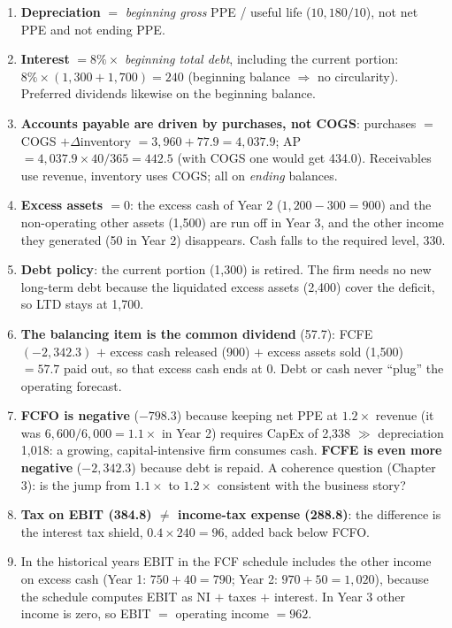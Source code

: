 \begin{addbox}
\begin{enumerate}[leftmargin=*]
  \item \textbf{Depreciation} $=$ \emph{beginning gross} PPE / useful life ($10{,}180/10$), not net PPE and not ending PPE.
  \item \textbf{Interest} $=8\%\times$ \emph{beginning total debt}, including the current portion: $8\%\times(1{,}300+1{,}700)=240$ (beginning balance $\Rightarrow$ no circularity). Preferred dividends likewise on the beginning balance.
  \item \textbf{Accounts payable are driven by purchases, not COGS}: purchases $=$ COGS $+\Delta$inventory $=3{,}960+77.9=4{,}037.9$; AP $=4{,}037.9\times40/365=442.5$ (with COGS one would get 434.0). Receivables use revenue, inventory uses COGS; all on \emph{ending} balances.
  \item \textbf{Excess assets $=0$}: the excess cash of Year 2 ($1{,}200-300=900$) and the non-operating other assets (1,500) are run off in Year 3, and the other income they generated (50 in Year 2) disappears. Cash falls to the required level, 330.
  \item \textbf{Debt policy}: the current portion (1,300) is retired. The firm needs no new long-term debt because the liquidated excess assets (2,400) cover the deficit, so LTD stays at 1,700.
  \item \textbf{The balancing item is the common dividend} (57.7): FCFE $(-2{,}342.3)$ $+$ excess cash released (900) $+$ excess assets sold (1,500) $=57.7$ paid out, so that excess cash ends at 0. Debt or cash never ``plug'' the operating forecast.
  \item \textbf{FCFO is negative} ($-798.3$) because keeping net PPE at $1.2\times$ revenue (it was $6{,}600/6{,}000=1.1\times$ in Year 2) requires CapEx of 2,338 $\gg$ depreciation 1,018: a growing, capital-intensive firm consumes cash. \textbf{FCFE is even more negative} ($-2{,}342.3$) because debt is repaid. A coherence question (Chapter 3): is the jump from $1.1\times$ to $1.2\times$ consistent with the business story?
  \item \textbf{Tax on EBIT (384.8) $\neq$ income-tax expense (288.8)}: the difference is the interest tax shield, $0.4\times240=96$, added back below FCFO.
  \item In the historical years EBIT in the FCF schedule includes the other income on excess cash (Year 1: $750+40=790$; Year 2: $970+50=1{,}020$), because the schedule computes EBIT as NI $+$ taxes $+$ interest. In Year 3 other income is zero, so EBIT $=$ operating income $=962$.
\end{enumerate}
\end{addbox}

